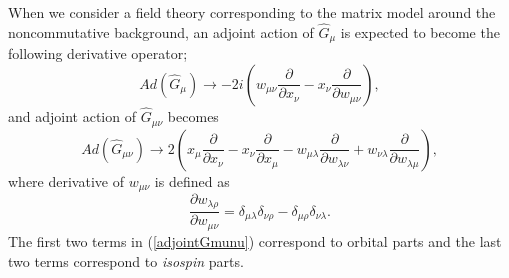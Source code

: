 \documentclass[a4paper,11pt]{article}
\begin{document}
When we consider a field theory corresponding to 
the matrix model around the noncommutative background, 
an adjoint action of $\hat{G}_{\mu}$ is expected to become 
the following derivative operator; 
\begin{equation}
Ad\left(\hat{G}_{\mu} \right)\rightarrow -2i\left(
w_{\mu\nu}\frac{\partial}{\partial x_{\nu}}
- x_{\nu}\frac{\partial}{\partial w_{\mu\nu}}
\right), 
\end{equation}
and adjoint action of $\hat{G}_{\mu\nu}$ becomes 
\begin{equation}
Ad\left(\hat{G}_{\mu\nu} \right)\rightarrow 2\left(
x_{\mu}\frac{\partial}{\partial x_{\nu}}
-x_{\nu}\frac{\partial}{\partial x_{\mu}}
-w_{\mu\lambda}\frac{\partial}{\partial w_{\lambda\nu}}
+w_{\nu\lambda}\frac{\partial}{\partial w_{\lambda\mu}}
\right), 
\label{adjointGmunu}
\end{equation}
where derivative of $w_{\mu\nu}$ is defined as 
\begin{equation}
\frac{\partial w_{\lambda\rho}}{\partial w_{\mu\nu}}
=\delta_{\mu\lambda}\delta_{\nu\rho}-\delta_{\mu\rho}\delta_{\nu\lambda}. 
\end{equation}
The first two terms in (\ref{adjointGmunu}) correspond to 
orbital parts and the last two terms correspond to {\it isospin} parts. 
\end{document}
